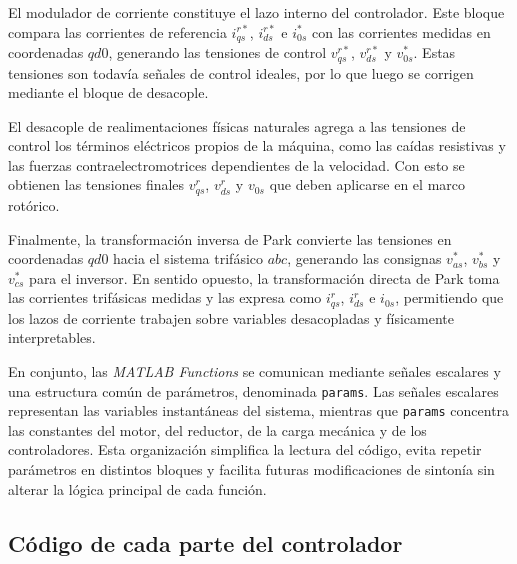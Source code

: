 \documentclass[12pt, a4paper,journal, onecolumn, compsoc]{IEEEtran}
\begin{document}
El modulador de corriente constituye el lazo interno del controlador. Este bloque compara las corrientes de referencia $i_{qs}^{r*}$, $i_{ds}^{r*}$ e $i_{0s}^{*}$ con las corrientes medidas en coordenadas $qd0$, generando las tensiones de control $v_{qs}^{r*}$, $v_{ds}^{r*}$ y $v_{0s}^{*}$. Estas tensiones son todavía señales de control ideales, por lo que luego se corrigen mediante el bloque de desacople.

El desacople de realimentaciones físicas naturales agrega a las tensiones de control los términos eléctricos propios de la máquina, como las caídas resistivas y las fuerzas contraelectromotrices dependientes de la velocidad. Con esto se obtienen las tensiones finales $v_{qs}^r$, $v_{ds}^r$ y $v_{0s}$ que deben aplicarse en el marco rotórico.

Finalmente, la transformación inversa de Park convierte las tensiones en coordenadas $qd0$ hacia el sistema trifásico $abc$, generando las consignas $v_{as}^*$, $v_{bs}^*$ y $v_{cs}^*$ para el inversor. En sentido opuesto, la transformación directa de Park toma las corrientes trifásicas medidas y las expresa como $i_{qs}^r$, $i_{ds}^r$ e $i_{0s}$, permitiendo que los lazos de corriente trabajen sobre variables desacopladas y físicamente interpretables.

En conjunto, las \textit{MATLAB Functions} se comunican mediante señales escalares y una estructura común de parámetros, denominada \texttt{params}. Las señales escalares representan las variables instantáneas del sistema, mientras que \texttt{params} concentra las constantes del motor, del reductor, de la carga mecánica y de los controladores. Esta organización simplifica la lectura del código, evita repetir parámetros en distintos bloques y facilita futuras modificaciones de sintonía sin alterar la lógica principal de cada función.
\subsection{Código de cada parte del controlador}
\end{document}
